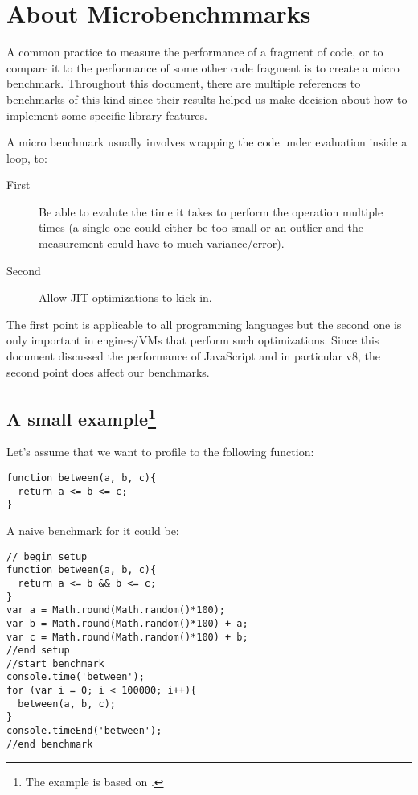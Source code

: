 \section{About Microbenchmmarks}
A common practice to measure the performance of a fragment of code, or to compare it to the performance of some other code fragment is to create a micro benchmark. Throughout this document, there are multiple references to benchmarks of this kind since their results helped us make decision about how to implement some specific library features.

A micro benchmark usually involves wrapping the code under evaluation inside a loop, to:

\begin{description}
\item[First] Be able to evalute the time it takes to perform the operation multiple times (a single one could either be too small or an outlier and the measurement could have to much variance/error).
\item[Second] Allow JIT optimizations to kick in.
\end{description}

The first point is applicable to all programming languages but the second one is only important in engines/VMs that perform such optimizations. Since this document discussed the performance of JavaScript and in particular v8, the second point does affect our benchmarks.

\subsection{A small example\protect\footnote{The example is based on \cite{mraleph-bc}.}}
Let's assume that we want to profile to the following function:
\begin{lstlisting}[caption=Function to benchmark]
function between(a, b, c){
  return a <= b <= c;
}
\end{lstlisting}

A naive benchmark for it could be:
\begin{lstlisting}[caption=Naive benchmark]
// begin setup
function between(a, b, c){
  return a <= b && b <= c;
}
var a = Math.round(Math.random()*100);
var b = Math.round(Math.random()*100) + a;
var c = Math.round(Math.random()*100) + b;
//end setup
//start benchmark
console.time('between');
for (var i = 0; i < 100000; i++){
  between(a, b, c);
}
console.timeEnd('between');
//end benchmark
\end{lstlisting}

